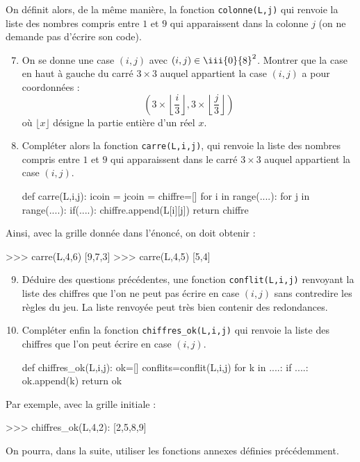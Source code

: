 \documentclass[a4paper,french,11pt,twoside]{VcCours}
\begin{document}
\medskip

On définit alors, de la même manière, la fonction {\tt colonne(L,j)} qui renvoie la liste des nombres compris entre $1$ et $9$ qui apparaissent dans la colonne $j$ (on ne demande pas d'écrire son code).


\begin{enumerate}
\setcounter{enumi}{6}
\item On se donne une case $(i,j)$ avec $(i,j) \in \iii{0}{8}^2$. Montrer que la case en haut à gauche du carré $3 \times 3$ auquel appartient la case $(i,j)$ a pour coordonnées :
$$  \left( 3 \times \left\lfloor \dfrac{i}{3} \right\rfloor , 3 \times \left\lfloor \dfrac{j}{3} \right\rfloor \right)$$
où $\lfloor x \rfloor$ désigne la partie entière d'un réel $x$.
\item Compléter alors la fonction {\tt carre(L,i,j)}, qui renvoie la liste des nombres compris entre $1$ et $9$ qui apparaissent dans le carré $3 \times 3$ auquel appartient la case $(i,j)$.
\begin{Python}
def carre(L,i,j):
    icoin =
    jcoin =
    chiffre=[]
    for i in range(....):
        for j in range(....):
            if(....):
                chiffre.append(L[i][j]) 
    return chiffre
\end{Python}
\end{enumerate}

Ainsi, avec la grille donnée dans l'énoncé, on doit obtenir :
\begin{Python*}
>>> carre(L,4,6)
[9,7,3]
>>> carre(L,4,5)
[5,4]
\end{Python*}

\begin{enumerate}\setcounter{enumi}{8}
\item Déduire des questions précédentes, une fonction {\tt conflit(L,i,j)} renvoyant la liste des chiffres que l'on ne peut pas écrire en case $(i,j)$ sans contredire les règles du jeu. La liste renvoyée peut très bien contenir des redondances. 
\item Compléter enfin la fonction {\tt chiffres\_ok(L,i,j)} qui renvoie la liste des chiffres que l'on peut écrire en case $(i,j)$.
\begin{Python}
def chiffres_ok(L,i,j):
    ok=[]
    conflits=conflit(L,i,j)
    for k in ....:
        if ....:
            ok.append(k)
    return ok
\end{Python}
\end{enumerate}
Par exemple, avec la grille initiale :
\begin{Python*}
>>> chiffres_ok(L,4,2):
[2,5,8,9]
\end{Python*}
On pourra, dans la suite, utiliser les fonctions annexes définies précédemment.
\end{document}
